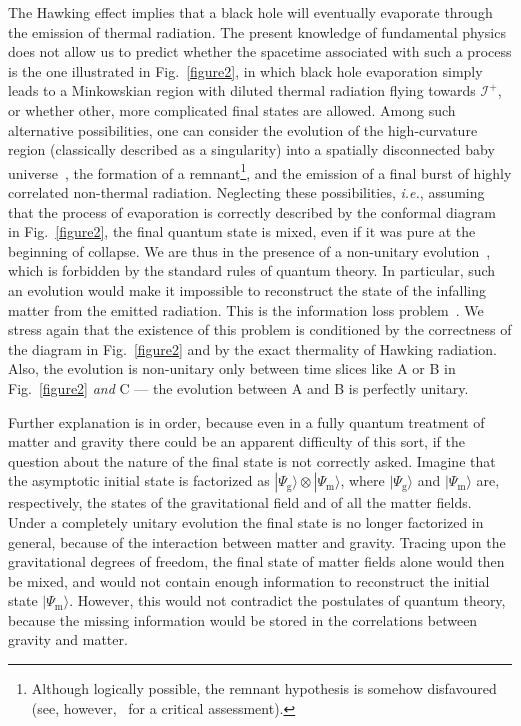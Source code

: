 \documentclass[prd,groupedaddress, showpacs, showkeys, onecolumn, nofootinbib, 12pt]{revtex4-2}
\def\ie{{\em i.e.\/}}%
\newcommand{\scri}{\mathscr{I}}
\begin{document}
The Hawking effect implies that a black hole will eventually evaporate through the emission of thermal radiation.  The present knowledge of fundamental physics does not allow us to predict whether the spacetime associated with such a process is the one illustrated in Fig.~\ref{figure2}, in which black hole evaporation simply leads to a Minkowskian region with diluted thermal radiation flying towards $\scri^+$, or whether other, more complicated final states are allowed.  Among such alternative possibilities, one can consider the evolution of the high-curvature region (classically described as a singularity) into a spatially disconnected baby universe~\cite{ted-valdivia}, the formation of a remnant\footnote{Although logically possible, the remnant hypothesis is somehow disfavoured~\cite{Giddings:1992hh, Giddings:1993km, Giddings:1993vj} (see, however,~\cite{Hossenfelder:2009xq} for a critical assessment).}, and the emission of a final burst of highly correlated non-thermal radiation.  Neglecting these possibilities, \ie, assuming that the process of evaporation is correctly described by the conformal diagram in Fig.~\ref{figure2}, the final quantum state is mixed, even if it was pure at the beginning of collapse.  We are thus in the presence of a  non-unitary evolution~\cite{Hawking:1976ra, Hawking:1982dj}, which is forbidden by the standard rules of quantum theory.   In particular, such an evolution would make it impossible to reconstruct the state of the infalling matter from the emitted radiation.  This is the information loss problem~\cite{Page:1993up, Giddings:1994zs}.  We stress again that the existence of this problem is conditioned by the correctness of the diagram in Fig.~\ref{figure2} and by the exact thermality of Hawking radiation.  Also, the evolution is non-unitary only between time slices like A or B in Fig.~\ref{figure2} {\em and\/} C --- the evolution between A and B is perfectly unitary.

Further explanation is in order, because even in a fully quantum treatment of matter and gravity there could be an apparent difficulty of this sort, if the question about the nature of the final state is not correctly asked.  Imagine that the asymptotic initial state is factorized as $|\Psi_\mathrm{g}\rangle\otimes |\Psi_\mathrm{m}\rangle$, where $|\Psi_\mathrm{g}\rangle$ and $|\Psi_\mathrm{m}\rangle$ are, respectively, the states of the gravitational field and of all the matter fields.  Under a completely unitary evolution the final state is no longer factorized in general, because of the interaction  between matter and gravity.  Tracing upon the gravitational degrees of freedom, the final state of matter fields alone would then be mixed, and would not contain enough information to reconstruct the initial state $|\Psi_\mathrm{m}\rangle$.  However, this would not contradict the postulates of quantum theory, because the missing information would be stored in the correlations between gravity and matter.
\end{document}
